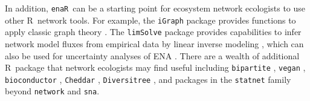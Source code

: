 \documentclass[11pt]{article}
\newcommand{\R}{R}
\newcommand{\enaR}{\texttt{enaR}}
\begin{document}
\begin{spacing}{2}
In addition, \enaR\ can be a starting point for ecosystem network
ecologists to use other \R\ network tools.  For example, the
\texttt{iGraph} package provides functions to apply classic graph
theory \citep{csardi06}.  The \texttt{limSolve} package provides
capabilities to infer network model fluxes from empirical data by
linear inverse modeling \citep{soetaert09}, which can also be used for
uncertainty analyses of ENA \citep{kones09}. There are a wealth of
additional \R\ package that network ecologists may find useful
including \texttt{bipartite} \citep{dormann2008}, \texttt{vegan}
\citep{dixon2003vegan}, \texttt{bioconductor}
\citep{gentleman2004bioconductor}, \texttt{Cheddar}
\citep{hudson2013}, \texttt{Diversitree} \citep{fitzjohn2012}, and
packages in the \texttt{statnet} family \citep{handcock2008statnet}
beyond \texttt{network} and \texttt{sna}.


\end{spacing}
\end{document}

